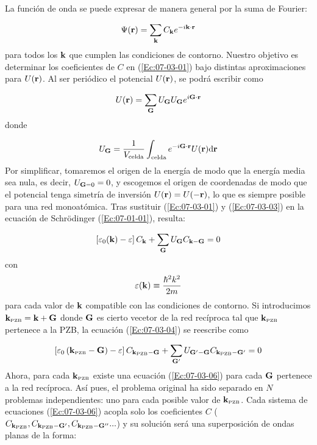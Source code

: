La función de onda se puede expresar de manera general por la suma de Fourier:

\begin{equation}
    \Psi (\mathbf{r}) = \sum_{\mathbf{k}} C_{\mathbf{k}} e^{-i\mathbf{k} \cdot \mathbf{r}} \label{Ec:07-03-01}
\end{equation}
para todos los $\mathbf{k}$ que cumplen las condiciones de contorno. Nuestro objetivo es determinar los coeficientes de $C$ en (\ref{Ec:07-03-01}) bajo distintas aproximaciones para $U(\mathbf{r})$. Al ser periódico el potencial $U(\mathbf{r})$, se podrá escribir como

\begin{eqnarray}
    U(\mathbf{r}) = \sum_{\mathbf{G}} U_{\mathbf{G}} U_{\mathbf{G}} e^{i \mathbf{G} \cdot \mathbf{r}}
\end{eqnarray}
donde 

\begin{eqnarray}
    U_{\mathbf{G}} = \frac{1}{V_{\text{celda}}} \int_{\text{celda}} e^{-i \mathbf{G} \cdot \mathbf{r}} U(\mathbf{r}) \mathrm{d} \mathbf{r} \label{Ec:07-03-03}
\end{eqnarray}
Por simplificar, tomaremos el origen de la energía de modo que la energía media sea nula, es decir, $U_{\mathbf{G}=0}=0$, y escogemos el origen de coordenadas de modo que el potencial tenga simetría de inversión $U(\mathbf{r})=U(-\mathbf{r})$, lo que es siempre posible para una red monoatómica. Tras sustituir (\ref{Ec:07-03-01}) y (\ref{Ec:07-03-03}) en la ecuación de Schrödinger (\ref{Ec:07-01-01}), resulta:

\begin{eqnarray}
    \left[ \varepsilon_0 (\mathbf{k}) - \varepsilon \right] C_{\mathbf{k}} + \sum_{\mathbf{G}} U_{\mathbf{G}} C_{\mathbf{k}-\mathbf{G}}=0 \label{Ec:07-03-04}
\end{eqnarray}
con 
\begin{eqnarray}
\varepsilon (\mathbf{k})\equiv \frac{\hbar^2 k^2}{2m}  \label{Ec:07-03-05}
\end{eqnarray}
para cada valor de $\mathbf{k}$ compatible con las condiciones de contorno. Si introducimos $\mathbf{k}_{\text{{\tiny PZB}}}=\mathbf{k}+\mathbf{G}$ donde $\mathbf{G}$ es cierto vecetor de la red recíproca tal que $\mathbf{k}_{\text{{\tiny PZB}}}$ pertenece a la PZB, la ecuación (\ref{Ec:07-03-04}) se reescribe como

\begin{eqnarray}
\left[ \varepsilon_0 \left( \mathbf{k}_{\text{{\tiny PZB}}} - \mathbf{G} \right) - \varepsilon \right] C_{\mathbf{k}_{\text{{\tiny PZB}}}-\mathbf{G}}  + \sum_{\mathbf{G}'} U_{\mathbf{G}'-\mathbf{G}} C_{\mathbf{k}_{\text{{\tiny PZB}}}-\mathbf{G}'} = 0  \label{Ec:07-03-06}
\end{eqnarray}
Ahora, para cada $\mathbf{k}_{\text{{\tiny PZB}}}$ existe una ecuación (\ref{Ec:07-03-06}) para cada $\mathbf{G}$ pertenece a la red recíproca. Así pues, el problema original ha sido separado en $N$ problemas independientes: uno para cada posible valor de $\mathbf{k}_{\text{{\tiny PZB}}}$. Cada sistema de ecuaciones (\ref{Ec:07-03-06}) acopla solo los coeficientes $C$ ($C_{\mathbf{k}_{\text{{\tiny PZB}}}},C_{\mathbf{k}_{\text{{\tiny PZB}}}-\mathbf{G}'},C_{\mathbf{k}_{\text{{\tiny PZB}}}-\mathbf{G}''}...$) y su solución será una superposición de ondas planas de la forma:

